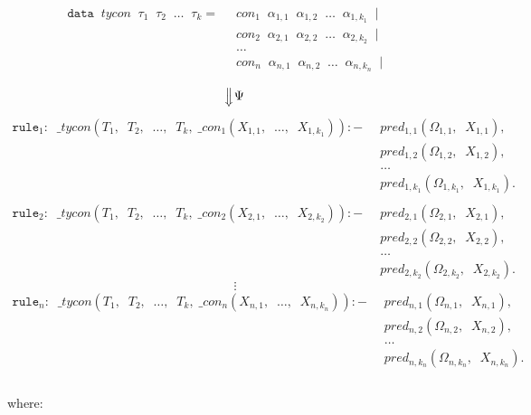 \documentclass{report}
\theoremstyle{definition}
\theoremstyle{definition}
\newcommand{\ttt}[1]{\texttt{#1}}
\newcommand{\tav}{\;\;}
\newcommand{\SLongdownarrow}{\mathrel{\rotatebox[origin=c]{-90}{$\Longrightarrow$}}}
\begin{document}
\begin{align*}
	\ttt{data} \tav tycon \tav \tau_1 \tav \tau_2 \tav \ldots \tav \tau_k 	=& \tav con_1 \tav \alpha_{1,1} \tav \alpha_{1,2} \tav \ldots \tav \alpha_{1,k_1} \tav | && \\
	& \tav con_2 \tav \alpha_{2,1} \tav \alpha_{2,2} \tav \ldots \tav \alpha_{2,k_2} \tav | && \\
	& \tav \ldots \tav && \\
	& \tav con_n \tav \alpha_{n,1} \tav \alpha_{n,2} \tav \ldots \tav \alpha_{n,k_n} \tav | && \\
\end{align*}
$$\SLongdownarrow \Psi$$
\begin{align*}
	\ttt{rule}_1: \tav \_ tycon (T_1, \tav T_2, \tav \ldots, \tav T_k, \; \_ con_1(X_{1,1}, \tav \ldots, \tav X_{1,k_1})) :-&
	\tav pred_{1, 1}(\Omega_{1,1}, \tav X_{1,1}), && \\
	& \tav pred_{1, 2}(\Omega_{1,2}, \tav X_{1,2}), && \\
	& \tav \ldots \tav && \\
	& \tav pred_{1, k_1}(\Omega_{1,k_1}, \tav X_{1,k_1}). && \\
	\\
	\ttt{rule}_2: \tav \_ tycon (T_1, \tav T_2, \tav \ldots, \tav T_k, \; \_ con_2(X_{2,1}, \tav \ldots, \tav X_{2,k_2})) :-&
	\tav pred_{2, 1}(\Omega_{2,1}, \tav X_{2,1}), && \\
	& \tav pred_{2, 2}(\Omega_{2,2}, \tav X_{2,2}), && \\
	& \tav \ldots \tav && \\
	& \tav pred_{2, k_2}(\Omega_{2,k_2}, \tav X_{2,k_2}). &&
\end{align*}
$$\vdots$$
\begin{align*}
	\ttt{rule}_n: \tav \_ tycon (T_1, \tav T_2, \tav \ldots, \tav T_k, \; \_ con_n(X_{n,1}, \tav \ldots, \tav X_{n,k_n})) :-&
	\tav pred_{n, 1}(\Omega_{n,1}, \tav X_{n,1}), && \\
	& \tav pred_{n, 2}(\Omega_{n,2}, \tav X_{n,2}), && \\
	& \tav \ldots \tav && \\
	& \tav pred_{n, k_n}(\Omega_{n,k_n}, \tav X_{n,k_n}). && \\
\end{align*}\\
where:
\end{document}
